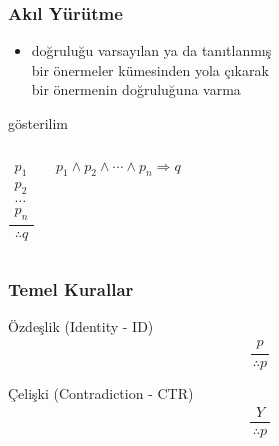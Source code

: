 \documentclass[dvipsnames]{beamer}
\theoremstyle{definition}
\theoremstyle{example}
\theoremstyle{plain}
\begin{document}
\begin{frame}
  \frametitle{Akıl Yürütme}

  \begin{itemize}
    \item doğruluğu varsayılan ya da tanıtlanmış\\
      bir önermeler kümesinden yola çıkarak\\
      bir önermenin doğruluğuna varma
  \end{itemize}

  \pause
  \begin{block}{gösterilim}
    \begin{columns}
      \[
      \frac
        {
          \begin{array}{c}
            p_1\\
            p_2\\
            \dots\\
            p_n
          \end{array}
        }
        {
          \therefore q
        }
      \]

      $p_1 \wedge p_2 \wedge \cdots \wedge p_n \Rightarrow q$
    \end{columns}
  \end{block}
\end{frame}

\begin{frame}
  \frametitle{Temel Kurallar}

  \begin{block}{Özdeşlik (Identity - ID)}
    \[
    \frac
      {
        \begin{array}{c}
          p
        \end{array}
      }
      {
        \therefore p
      }
    \]
  \end{block}

  \pause
  \begin{block}{Çelişki (Contradiction - CTR)}
  \[
  \frac
    {
      \begin{array}{c}
        Y
      \end{array}
    }
    {
      \therefore p
    }
  \]
  \end{block}
\end{frame}
\end{document}
